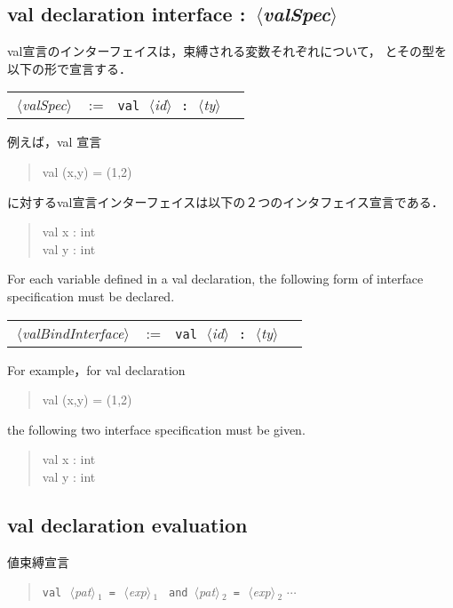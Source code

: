 \documentclass{jbook}
\newcommand{\txt}[2]{#2}
\newcommand{\nonterm}[1]{\mbox{$\,\langle$}{\it #1}\mbox{$\rangle\,$}}
\newcommand{\term}[1]{\mbox{{\tt #1}}}
\newenvironment{program}{\begin{quote}\begin{tt}}%
                        {\end{tt}\end{quote}}
\begin{document}
\subsection{\txt{val宣言インタフェイス}{val declaration interface} : \nonterm{valSpec}}
\ifjp%
	val宣言のインターフェイスは，束縛される変数それぞれについて，
とその型を以下の形で宣言する．
\begin{center}
\begin{tabular}{lcll}
\nonterm{valSpec} &:=& \term{val}\ \nonterm{id}\ \term{:}\ \nonterm{ty}
\end{tabular}
\end{center}
	例えば，val 宣言
\begin{program}
val (x,y) = (1,2)
\end{program}
に対するval宣言インターフェイスは以下の２つのインタフェイス宣言である．
\begin{program}
val x : int\\
val y : int
\end{program}
\else%
	For each variable defined in a val declaration, the following
form of interface specification must be declared.
\begin{center}
\begin{tabular}{lcll}
\nonterm{valBindInterface} &:=& \term{val}\ \nonterm{id}\ \term{:}\ \nonterm{ty}
\end{tabular}
\end{center}
	For example，for val declaration
\begin{program}
val (x,y) = (1,2)
\end{program}
the following two interface specification must be given.
\begin{program}
val x : int\\
val y : int
\end{program}
\fi%

\subsection{\txt{val宣言の評価}{val declaration evaluation}}
\ifjp%

	値束縛宣言

\begin{program}
\term{val}\ \nonterm{pat}$_1$\ \term{=}\ \nonterm{exp}$_1$ \ \term{and} \nonterm{pat}$_2$\ \term{=}\ \nonterm{exp}$_2$ $\cdots$
\end{program}
\end{document}
